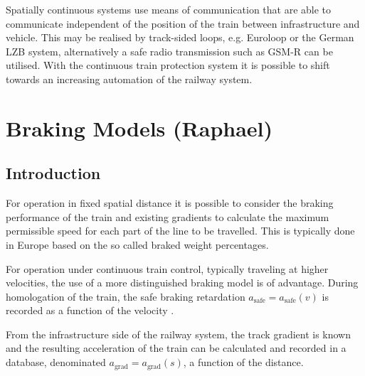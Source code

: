 \documentclass[a4paper, 12pt]{scrartcl}
\begin{document}
Spatially continuous systems use means of communication that are able to communicate independent of the position of the train between infrastructure and vehicle. This may be realised by track-sided loops, e.g. Euroloop or the German LZB system, alternatively a safe radio transmission such as GSM-R can be utilised. With the continuous train protection system it is possible to shift towards an increasing automation of the railway system. 

\section{Braking Models (Raphael)}
\subsection{Introduction}
For operation in fixed spatial distance it is possible to consider the braking performance of the train and existing gradients to calculate the maximum permissible speed for each part of the line to be travelled. This is typically done in Europe based on the so called braked weight percentages. 

For operation under continuous train control, typically traveling at higher velocities, the use of a more distinguished braking model is of advantage. During homologation of the train, the safe braking retardation $a_{\text{safe}} = a_{\text{safe}}(v)$ is recorded as a function of the velocity \cite{gropler2008bremswege}.

From the infrastructure side of the railway system, the track gradient is known and the resulting acceleration of the train can be calculated and recorded in a database, denominated $a_{\text{grad}} = a_{\text{grad}}(s)$, a function of the distance.
\end{document}
